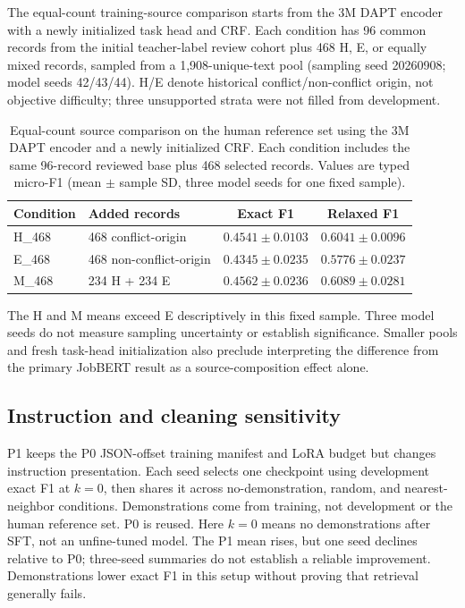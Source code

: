 \label{sec:hem}
The equal-count training-source comparison starts from the 3M DAPT encoder with a newly initialized task head and CRF. Each condition has 96 common records from the initial teacher-label review cohort plus 468 H, E, or equally mixed records, sampled from a 1,908-unique-text pool (sampling seed 20260908; model seeds 42/43/44). H/E denote historical conflict/non-conflict origin, not objective difficulty; three unsupported strata were not filled from development.
\begin{table}[htbp]
\caption{Equal-count source comparison on the human reference set using the 3M DAPT encoder and a newly initialized CRF. Each condition includes the same 96-record reviewed base plus 468 selected records. Values are typed micro-F1 (mean $\pm$ sample SD, three model seeds for one fixed sample).}
\label{tab:hem-supplement}
\centering
\small
\begin{tabular}{@{}llcc@{}}
\toprule
Condition & Added records & Exact F1 & Relaxed F1 \\
\midrule
H\_468 & 468 conflict-origin & $0.4541\pm0.0103$ & $0.6041\pm0.0096$ \\
E\_468 & 468 non-conflict-origin & $0.4345\pm0.0235$ & $0.5776\pm0.0237$ \\
M\_468 & 234 H + 234 E & $0.4562\pm0.0236$ & $0.6089\pm0.0281$ \\
\bottomrule
\end{tabular}
\end{table}
\FloatBarrier
The H and M means exceed E descriptively in this fixed sample. Three model seeds do not measure sampling uncertainty or establish significance. Smaller pools and fresh task-head initialization also preclude interpreting the difference from the primary JobBERT result as a source-composition effect alone.

\subsection{Instruction and cleaning sensitivity}
\label{sec:efg-followup}
\label{sec:p1-contrast}
P1 keeps the P0 JSON-offset training manifest and LoRA budget but changes instruction presentation. Each seed selects one checkpoint using development exact F1 at $k=0$, then shares it across no-demonstration, random, and nearest-neighbor conditions. Demonstrations come from training, not development or the human reference set. P0 is reused. Here $k=0$ means no demonstrations after SFT, not an unfine-tuned model. The P1 mean rises, but one seed declines relative to P0; three-seed summaries do not establish a reliable improvement. Demonstrations lower exact F1 in this setup without proving that retrieval generally fails.

